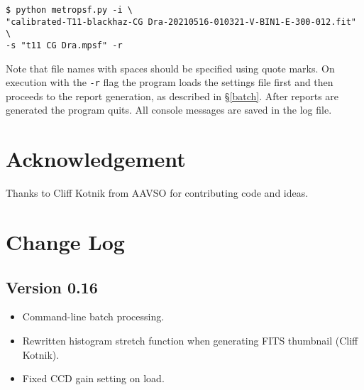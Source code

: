 \documentclass{article}
\begin{document}
\begin{verbatim}
$ python metropsf.py -i \
"calibrated-T11-blackhaz-CG Dra-20210516-010321-V-BIN1-E-300-012.fit" \
-s "t11 CG Dra.mpsf" -r
\end{verbatim}

Note that file names with spaces should be specified using quote marks. On execution with the \texttt{-r} flag the program loads the settings file first and then proceeds to the report generation, as described in \S \ref{batch}. After reports are generated the program quits. All console messages are saved in the log file.

\section {Acknowledgement} 
Thanks to Cliff Kotnik from AAVSO for contributing code and ideas.

\section{Change Log}

\subsection{Version 0.16}
\begin{itemize}
\item Command-line batch processing.
\item Rewritten histogram stretch function when generating FITS thumbnail (Cliff Kotnik).
\item Fixed CCD gain setting on load.
\end{itemize}
\end{document}
